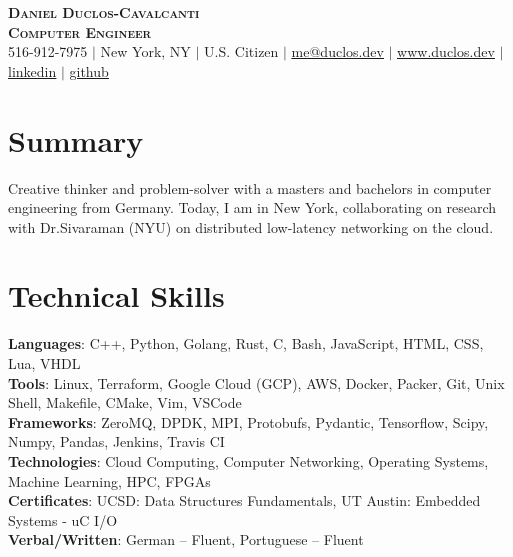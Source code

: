 \documentclass[letterpaper,11pt]{article}
\begin{document}
\begin{flushright}
\end{flushright}

\vspace{-5.0pt}

\begin{center}
    \textbf{\Huge \scshape Daniel Duclos-Cavalcanti} \\ \vspace{1pt}
    \textbf{\large{\scshape Computer Engineer}} \\ \vspace{1pt}
    \small 516-912-7975 $|$ New York, NY $|$ U.S. Citizen $|$
    \href{mailto:me@duclos.dev}{\underline{me@duclos.dev}} $|$ 
    \href{https://www.duclos.dev}{\underline{www.duclos.dev}} $|$
    \href{https://www.linkedin.com/in/duclos-cavalcanti/}{\underline{linkedin}} $|$
    \href{https://github.com/duclos-cavalcanti}{\underline{github}} 
\end{center}

\vspace{-8.0pt}

\section{Summary}
\small{
Creative thinker and problem-solver with a masters and bachelors in 
computer engineering from Germany. Today, I am in New York, 
collaborating on research with Dr.Sivaraman (NYU) on distributed 
low-latency networking on the cloud.
}

\vspace{-8.0pt}

\section{Technical Skills}
 \begin{itemize}[leftmargin=0.15in, label={}]
    \small{\item{
    \textbf{Languages}{: C++, Python, Golang, Rust, C, Bash, JavaScript, HTML, CSS, Lua, VHDL} \\
    \textbf{Tools}{: Linux, Terraform, Google Cloud (GCP), AWS, Docker, Packer, Git, Unix Shell, Makefile, CMake, Vim, VSCode} \\
    \textbf{Frameworks}{: ZeroMQ, DPDK, MPI, Protobufs, Pydantic, Tensorflow, Scipy, Numpy, Pandas, Jenkins, Travis CI} \\
    \textbf{Technologies}{: Cloud Computing, Computer Networking, Operating Systems, Machine Learning, HPC, FPGAs} \\
    \textbf{Certificates}{: UCSD: Data Structures Fundamentals, UT Austin: Embedded Systems - uC I/O} \\
    \textbf{Verbal/Written}{: German -- Fluent, Portuguese -- Fluent}
    }}
 \end{itemize}
\end{document}
